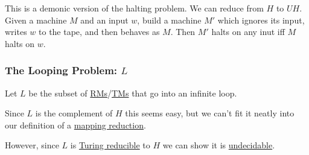 \documentclass{article}
\begin{document}
This is a demonic version of the halting problem. We can reduce from $H$ to $UH$. Given a machine $M$ and an input $w$, build a machine $M'$ which ignores its input, writes $w$ to the tape, and then behaves as $M$. Then $M'$ halts on any inut iff $M$ halts on $w$.

\subsubsection{The Looping Problem: $L$}\label{looping}
Let $L$ be the subset of \hyperref[rm]{RMs}/\hyperref[tm]{TMs} that go into an infinite loop.

Since $L$ is the complement of \hyperref[halting]{$H$} this seems easy, but we can't fit it neatly into our definition of a \hyperref[mapping-reduction]{mapping reduction}.

However, since $L$ is \hyperref[turing-reduction]{Turing reducible} to $H$ we can show it is \hyperref[undecidable]{undecidable}.
\end{document}

